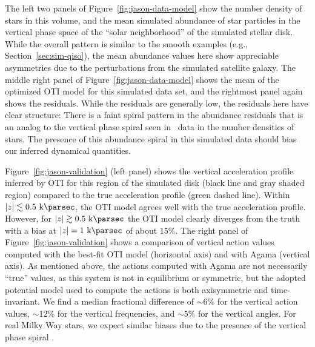 The left two panels of Figure~\ref{fig:jason-data-model} show the number density of
stars in this volume, and the mean simulated  abundance of star particles
in the vertical phase space of the ``solar neighborhood'' of the simulated stellar disk.
While the overall pattern is similar to the smooth examples (e.g.,
Section~\ref{sec:sim-qiso}), the mean abundance values here show appreciable asymmetries
due to the perturbations from the simulated satellite galaxy.
The middle right panel of Figure~\ref{fig:jason-data-model} shows the mean 
of the optimized OTI model for this simulated data set, and the rightmost panel again
shows the residuals.
While the residuals are generally low, the residuals here have clear structure: There is
a faint spiral pattern in the abundance residuals that is an analog to the vertical
phase spiral seen in \gaia\ data in the number densities of stars.
The presence of this abundance spiral in this simulated data should bias our inferred
dynamical quantities.

Figure~\ref{fig:jason-validation} (left panel) shows the vertical acceleration profile
inferred by OTI for this region of the simulated disk (black line and gray shaded
region) compared to the true acceleration profile (green dashed line).
Within $|z| \lesssim 0.5~\kpc$, the OTI model agrees well with the true acceleration
profile.
However, for $|z| \gtrsim 0.5~\kpc$ the OTI model clearly diverges from the truth with a
bias at $|z| = 1~\kpc$ of about $15\%$.
The right panel of Figure~\ref{fig:jason-validation} shows a comparison of vertical
action values computed with the best-fit OTI model (horizontal axis) and with Agama
(vertical axis).
As mentioned above, the actions computed with Agama are not necessarily ``true'' values,
as this system is not in equilibrium or symmetric, but the adopted potential model used
to compute the actions is both axisymmetric and time-invariant.
We find a median fractional difference of $\sim 6\%$ for the vertical action values,
$\sim 12\%$ for the vertical frequencies, and $\sim 5\%$ for the vertical angles.
For real Milky Way stars, we expect similar biases due to the presence of the vertical
phase spiral \citep{Antoja:2018}.


